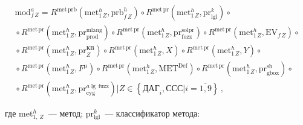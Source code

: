  \begin{multline}


\mathrm{mod}^a_{f\,Z}=R^{\mathrm{met}\,\mathrm{prb}}\left(


\mathrm{met}^h_{1\,Z},\mathrm{prb}^h_{f\,Z}\right) \circ


R^{\mathrm{met\,pr}}\left( \mathrm{met}^h_{1\,Z},\mathrm{pr}^k_{\mathrm{lgl}}\right) \circ{}\\


{}\circ R^{\mathrm{met\,pr}}\left(


\mathrm{met}^h_{1\,Z},\mathrm{pr}_{\mathrm{prod}}^{\mathrm{mlang}}\right)


 \circ R^{\mathrm{met\,pr}}\left( \mathrm{met}^h_{1\,Z},\mathrm{pr}_{\mathrm{fuzz}}^{\mathrm{solpr}}\right)\circ


R^{\mathrm{met\,pr}}\left(


\mathrm{met}^h_{1\,Z}, \mathrm{EV}_{f\,Z}\right) \circ{}\\


{}\circ R^{\mathrm{met\,pr}}\left(


\mathrm{met}^h_{1\,Z},\mathrm{pr}_Z^{\mathrm{КВ}}\right)\circ


 R^{\mathrm{met\,pr}}\left( \mathrm{met}^h_{1\,Z},X\right)\circ


 R^{\mathrm{met\,pr}}\left( \mathrm{met}^h_{1\,Z},Y\right) \circ {}\\


{}\circ R^{\mathrm{met\,pr}}\left( \mathrm{met}^h_{1\,Z},F^\mu\right)\circ


R^{\mathrm{met\,pr}}\left(


\mathrm{met}^h_{1\,Z},\mathrm{MET}^{\mathrm{Def}}\right)\circ


R^{\mathrm{met\,pr}}\left( \mathrm{met}^h_{1\,Z}, \mathrm{pr}^{\mathrm{sh}}_{\mathrm{gbox}}


\right) \circ{}\\


{}\circ R^{\mathrm{met\,pr}}\left(


\mathrm{met}^h_{1\,Z}, \mathrm{pr}_{\mathrm{cyg}}^{a\lg\,\mathrm{fuzz}}\right) \Big\vert Z\in \left\{ \mathrm{ДАГ}_i,


\mathrm{ССС}\vert i=\overline{1,9}\right\}\,,


 \label{e5-kir}


 \end{multline}


где met$^h_{1,\,Z}$~--- метод; pr$^k_{\mathrm{lgl}}$~--- классификатор метода:


